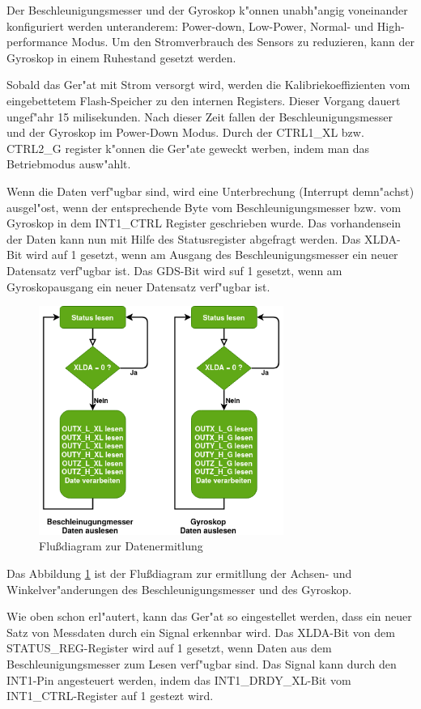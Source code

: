 Der Beschleunigungsmesser und der Gyroskop k"onnen unabh"angig voneinander konfiguriert werden unteranderem: Power-down, Low-Power, Normal- und High- performance Modus. Um den Stromverbrauch des Sensors zu reduzieren, kann der Gyroskop in einem Ruhestand gesetzt werden.


Sobald das Ger"at mit Strom versorgt wird, werden die Kalibriekoeffizienten vom eingebettetem Flash-Speicher zu den internen Registers. Dieser Vorgang dauert ungef"ahr 15 milisekunden. Nach dieser Zeit fallen der Beschleunigungsmesser und der Gyroskop im Power-Down Modus. Durch der CTRL1\_XL bzw. CTRL2\_G register k"onnen die Ger"ate geweckt werben, indem man das Betriebmodus ausw"ahlt.

Wenn die Daten verf"ugbar sind, wird eine Unterbrechung (Interrupt demn"achst) ausgel"ost, wenn der entsprechende Byte vom Beschleunigungsmesser bzw. vom Gyroskop in dem INT1\_CTRL Register geschrieben wurde. Das vorhandensein der Daten kann nun mit Hilfe des Statusregister abgefragt werden. Das XLDA-Bit wird auf 1 gesetzt, wenn am Ausgang des Beschleunigungsmesser ein neuer Datensatz verf"ugbar ist. Das GDS-Bit wird suf 1 gesetzt, wenn am Gyroskopausgang ein neuer Datensatz verf"ugbar ist.

\begin{figure}[h]
	\centering
	\includegraphics[width=8cm]{source/images/Gy_Acc_data}
	\caption{Flu\ss{}diagram zur Datenermitlung}\label{Gy_Acc_data}
\end{figure}

Das Abbildung \ref{Gy_Acc_data} ist der Flu\ss{}diagram zur ermitllung der Achsen- und Winkelver"anderungen des Beschleunigungsmesser und des Gyroskop.

Wie oben schon erl"autert, kann das Ger"at so eingestellet werden, dass ein neuer Satz von Messdaten durch ein Signal erkennbar wird. Das XLDA-Bit von dem STATUS\_REG-Register wird auf 1 gesetzt, wenn Daten aus dem Beschleunigungsmesser zum Lesen verf"ugbar sind. Das Signal kann durch den INT1-Pin angesteuert werden, indem  das INT1\_DRDY\_XL-Bit vom INT1\_CTRL-Register auf 1 gestezt wird. 

